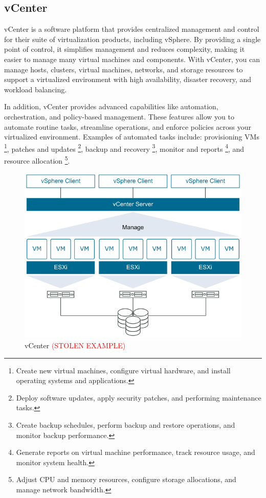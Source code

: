 \subsection{vCenter}
vCenter is a software platform that provides centralized management and control for their suite of virtualization products, including vSphere. By providing a single point of control, it simplifies management and reduces complexity, making it easier to manage many virtual machines and components. With vCenter, you can manage hosts, clusters, virtual machines, networks, and storage resources to support a virtualized environment with high availability, disaster recovery, and workload balancing.

In addition, vCenter provides advanced capabilities like automation, orchestration, and policy-based management. These features allow you to automate routine tasks, streamline operations, and enforce policies across your virtualized environment. Examples of automated tasks include: provisioning VMs \footnote{Create new virtual machines, configure virtual hardware, and install operating systems and applications.}, patches and updates \footnote{Deploy software updates, apply security patches, and performing maintenance tasks.}, backup and recovery \footnote{Create backup schedules, perform backup and restore operations, and monitor backup performance.}, monitor and reports \footnote{Generate reports on virtual machine performance, track resource usage, and monitor system health.}, and resource allocation \footnote{Adjust CPU and memory resources, configure storage allocations, and manage network bandwidth.}.

\begin{figure}[H]
    \centering
    \includegraphics[scale = 0.65]{images/vmware-infrastructure-relationship.png}
    \caption{vCenter \textcolor{red}{(STOLEN EXAMPLE)} }
    \label{vCenter}
\end{figure}

